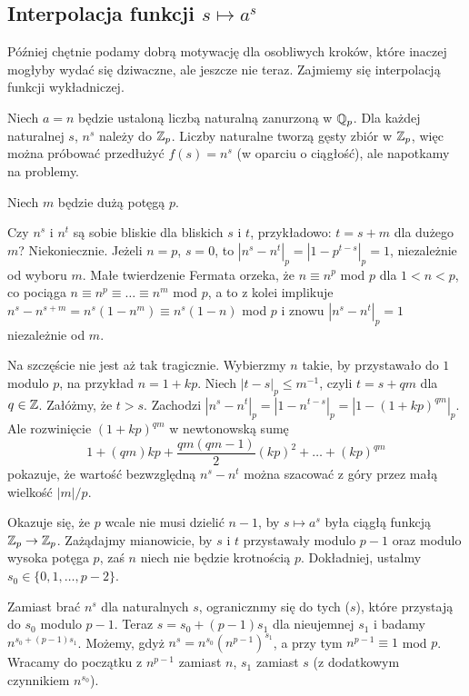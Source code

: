 \subsection{Interpolacja funkcji $s \mapsto a^s$}
Później  chętnie podamy dobrą motywację dla osobliwych kroków, które inaczej mogłyby wydać się dziwaczne, ale jeszcze nie teraz.
Zajmiemy się interpolacją funkcji wykładniczej.

Niech $a = n$ będzie ustaloną liczbą naturalną zanurzoną w $\mathbb Q_p$.
Dla każdej naturalnej $s$, $n^s$ należy do $\mathbb Z_p$.
Liczby naturalne tworzą gęsty zbiór w $\mathbb Z_p$, więc można próbować przedłużyć $f(s) = n^s$ (w oparciu o ciągłość), ale napotkamy na problemy.

Niech $m$ będzie dużą potęgą $p$.

Czy $n^s$ i $n^t$ są sobie bliskie dla bliskich $s$ i $t$, przykładowo: $t = s + m$ dla dużego $m$?
Niekoniecznie.
Jeżeli $n = p$, $s = 0$, to $|n^s - n^t|_p = |1 - p^{t-s}|_p = 1$, niezależnie od wyboru $m$.
Małe twierdzenie Fermata orzeka, że $n \equiv n^p$ mod $p$ dla $1 < n < p$, co pociąga $n \equiv n^p \equiv \ldots \equiv n^{m}$ mod $p$, a to z kolei implikuje $n^s - n^{s + m} = n^s(1 - n^m) \equiv n^s (1-n)$ mod $p$ i znowu $|n^s - n^t|_p = 1$ niezależnie od $m$.

Na szczęście nie jest aż tak tragicznie.
Wybierzmy $n$ takie, by przystawało do $1$ modulo $p$, na przykład $n = 1 + kp$.
Niech $|t - s|_p \le m^{-1}$, czyli $t = s + qm$ dla $q \in \mathbb Z$.
Załóżmy, że $t > s$.
Zachodzi $|n^s - n^t|_p = |1-n^{t-s}|_p = |1 - (1 + kp)^{qm}|_p$.
Ale rozwinięcie $(1 + kp)^{qm}$ w newtonowską sumę 
\[
	1 + (qm)kp + \frac{qm(qm - 1)}{2} (kp)^2 + \ldots + (kp)^{qm}
\]
pokazuje, że wartość bezwzględną $n^s - n^t$ można szacować z góry przez małą wielkość $|m| / p$.

Okazuje się, że $p$ wcale nie musi dzielić $n - 1$, by $s \mapsto a^s$ była ciągłą funkcją $\mathbb Z_p \to \mathbb Z_p$.
Zażądajmy mianowicie, by $s$ i $t$ przystawały modulo $p - 1$ oraz modulo wysoka potęga $p$, zaś $n$ niech nie będzie krotnością $p$.
Dokładniej, ustalmy $s_0 \in \{0, 1, \ldots, p -2\}$.

Zamiast brać $n^s$ dla naturalnych $s$, ogranicznmy się do tych ($s$), które przystają do $s_0$ modulo $p-1$.
Teraz $s = s_0 + (p-1)s_1$ dla nieujemnej $s_1$ i badamy $n^{s_0 + (p-1)s_1}$.
Możemy, gdyż $n^s = n^{s_0} (n^{p-1})^{s_1}$, a przy tym $n^{p-1} \equiv 1$ mod $p$.
Wracamy do początku z $n^{p-1}$ zamiast $n$, $s_1$ zamiast $s$ (z dodatkowym czynnikiem $n^{s_0}$).

